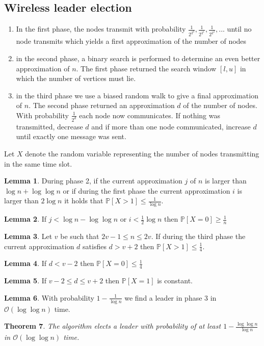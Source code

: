 \documentclass[a4paper, 12pt]{article}
\theoremstyle{plain}
\newtheorem{theorem}{Theorem}[section] %
\theoremstyle{definition}
\theoremstyle{lemma}
\newtheorem{lemma}[theorem]{Lemma}
\theoremstyle{remark}
\theoremstyle{corollary}
\theoremstyle{example}
\begin{document}
	\subsection{Wireless leader election}
	\begin{enumerate}
		\item In the first phase, the nodes transmit with probability $\frac{1}{2^{2^0}},\frac{1}{2^{2^1}},\frac{1}{2^{2^2}},...$ until no node transmits which yields a first approximation of the number of nodes
		\item in the second phase, a binary search is performed to determine an even better approximation of $n$. The first phase returned the search window $[l,u]$ in which the number of vertices must lie.
		\item in the third phase we use a biased random walk to give a final approximation of $n$. The second phase returned an approximation $d$ of the number of nodes. With probability $\frac{1}{2^d}$ each node now communicates. If nothing was transmitted, decrease $d$ and if more than one node communicated, increase $d$ until exactly one message was sent.
	\end{enumerate}
	Let $X$ denote the random variable representing the number of nodes transmitting in the same time slot.
	\begin{lemma}
		During phase 2, if the current approximation $j$ of $n$ is larger than $\log n + \log \log n$ or if during the first phase the current approximation $i$ is larger than $2\log n$ it holds that $\mathbb{P}[X>1] \leq \frac{1}{\log n}$. 
	\end{lemma}
	\begin{lemma}
		If $j<\log n - \log \log n$ or $i < \frac{1}{2} \log n$ then $\mathbb{P}[X=0] \geq \frac{1}{n}$
	\end{lemma}
	\begin{lemma}
		Let $v$ be such that $2v-1 \leq n \leq 2v$. If during the third phase the current approximation $d$ satisfies $d > v+2$ then $\mathbb{P}[X>1] \leq \frac{1}{4}$.
	\end{lemma}
	\begin{lemma}
		If $d<v-2$ then $\mathbb{P}[X=0] \leq \frac{1}{4}$
	\end{lemma}
	\begin{lemma}
		If $v-2 \leq d \leq v+2$ then $\mathbb{P}[X=1]$ is constant.
	\end{lemma}
	\begin{lemma}
		With probability $1-\frac{1}{\log n}$ we find a leader in phase 3 in $\mathcal{O}(\log \log n)$ time.
	\end{lemma}
	\begin{theorem}
		The algorithm elects a leader with probability of at least $1-\frac{\log \log n}{\log n}$ in $\mathcal{O}(\log \log n)$ time.
	\end{theorem}
\end{document}
